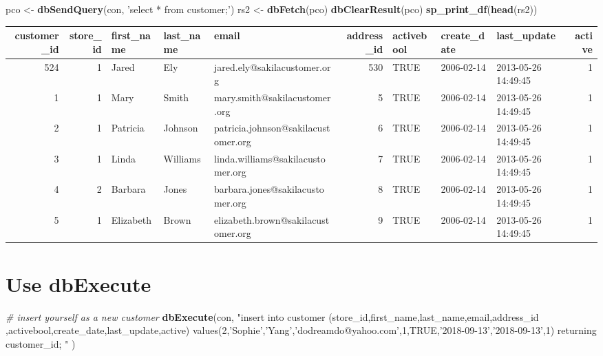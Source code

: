 \documentclass[]{book}
\newenvironment{Shaded}{\begin{snugshade}}{\end{snugshade}}
\newcommand{\CommentTok}[1]{\textcolor[rgb]{0.56,0.35,0.01}{\textit{#1}}}
\newcommand{\KeywordTok}[1]{\textcolor[rgb]{0.13,0.29,0.53}{\textbf{#1}}}
\newcommand{\NormalTok}[1]{#1}
\newcommand{\StringTok}[1]{\textcolor[rgb]{0.31,0.60,0.02}{#1}}
\theoremstyle{definition}
\theoremstyle{definition}
\theoremstyle{definition}
\theoremstyle{remark}
\begin{document}
\begin{Shaded}
\begin{Highlighting}[]
\NormalTok{pco <-}\StringTok{ }\KeywordTok{dbSendQuery}\NormalTok{(con, }\StringTok{'select * from customer;'}\NormalTok{)}
\NormalTok{rs2  <-}\StringTok{ }\KeywordTok{dbFetch}\NormalTok{(pco)}
\KeywordTok{dbClearResult}\NormalTok{(pco)}
\KeywordTok{sp_print_df}\NormalTok{(}\KeywordTok{head}\NormalTok{(rs2))}
\end{Highlighting}
\end{Shaded}

\begin{tabular}{r|r|l|l|l|r|l|l|l|r}
\hline
customer\_id & store\_id & first\_name & last\_name & email & address\_id & activebool & create\_date & last\_update & active\\
\hline
524 & 1 & Jared & Ely & jared.ely@sakilacustomer.org & 530 & TRUE & 2006-02-14 & 2013-05-26 14:49:45 & 1\\
\hline
1 & 1 & Mary & Smith & mary.smith@sakilacustomer.org & 5 & TRUE & 2006-02-14 & 2013-05-26 14:49:45 & 1\\
\hline
2 & 1 & Patricia & Johnson & patricia.johnson@sakilacustomer.org & 6 & TRUE & 2006-02-14 & 2013-05-26 14:49:45 & 1\\
\hline
3 & 1 & Linda & Williams & linda.williams@sakilacustomer.org & 7 & TRUE & 2006-02-14 & 2013-05-26 14:49:45 & 1\\
\hline
4 & 2 & Barbara & Jones & barbara.jones@sakilacustomer.org & 8 & TRUE & 2006-02-14 & 2013-05-26 14:49:45 & 1\\
\hline
5 & 1 & Elizabeth & Brown & elizabeth.brown@sakilacustomer.org & 9 & TRUE & 2006-02-14 & 2013-05-26 14:49:45 & 1\\
\hline
\end{tabular}

\hypertarget{use-dbexecute}{%
\section{Use dbExecute}\label{use-dbexecute}}

\begin{Shaded}
\begin{Highlighting}[]
\CommentTok{# insert yourself as a new customer}
\KeywordTok{dbExecute}\NormalTok{(con,}
  \StringTok{"insert into customer }
\StringTok{  (store_id,first_name,last_name,email,address_id}
\StringTok{  ,activebool,create_date,last_update,active)}
\StringTok{  values(2,'Sophie','Yang','dodreamdo@yahoo.com',1,TRUE,'2018-09-13','2018-09-13',1)}
\StringTok{  returning customer_id;}
\StringTok{  "}
\NormalTok{  )}
\end{Highlighting}
\end{Shaded}
\end{document}
